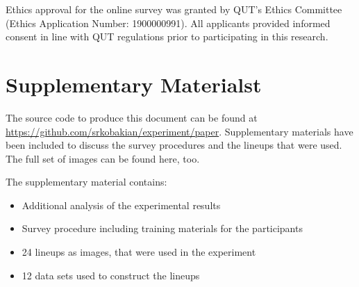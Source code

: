 \documentclass[journal]{vgtc}                     %
\begin{document}
Ethics approval for the online survey was granted by QUT's Ethics Committee (Ethics Application Number: 1900000991). All applicants provided informed consent in line with QUT regulations prior to participating in this research.

\hypertarget{supplementary}{%
\section{Supplementary Materialst}\label{supplementary}}

The source code to produce this document can be found at \url{https://github.com/srkobakian/experiment/paper}.
Supplementary materials have been included to discuss the survey procedures and the lineups that were used.
The full set of images can be found here, too.

The supplementary material contains:

\begin{itemize} \itemsep 0in
\item
  Additional analysis of the experimental results
\item
  Survey procedure including training materials for the participants
\item
  24 lineups as images, that were used in the experiment
\item
  12 data sets used to construct the lineups
\end{itemize}




\end{document}
